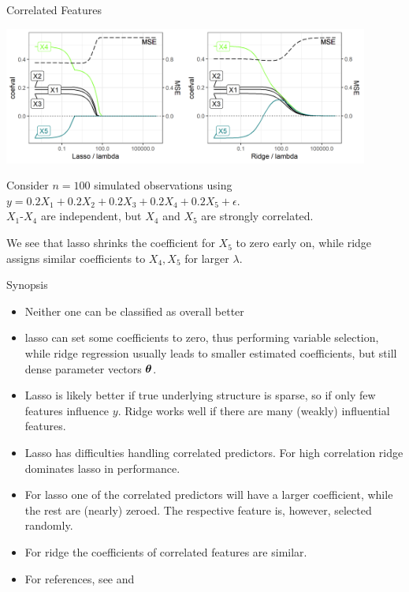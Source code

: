 \documentclass[11pt,compress,t,notes=noshow, xcolor=table]{beamer}
\begin{document}
\begin{vbframe}{Correlated Features}


\includegraphics[width=0.9\textwidth]{figure/regu_example_multicollinearity.png}

Consider $n=100$ simulated observations using $y = 0.2X_1 + 0.2X_2 + 0.2X_3 + 0.2X_4 + 0.2X_5 + \epsilon$.\\
$X_1$-$X_4$ are independent, but $X_4$ and $X_5$ are strongly correlated.

\vspace{0.1cm}

We see that lasso shrinks the coefficient for $X_5$ to zero early on, while ridge assigns similar coefficients to $X_4, X_5$ for larger $\lambda$.

\end{vbframe}


\begin{vbframe}{Synopsis}

\begin{itemize}
\item Neither one can be classified as overall better
\item lasso can set some coefficients to zero, thus performing variable selection, while ridge regression usually leads to smaller estimated coefficients, but still dense parameter vectors $\bm{\theta}$.
\item Lasso is likely better if true underlying structure is sparse, so if only few features influence $y$. Ridge works well if there are many (weakly) influential features.
\item Lasso has difficulties handling correlated predictors. For high correlation ridge dominates lasso in performance.
\item For lasso one of the correlated predictors will have a larger coefficient, while the rest are (nearly) zeroed. The respective feature is, however, selected randomly. 
\item For ridge the coefficients of correlated features are similar.
\item For references, see  and 
\end{itemize}

\end{vbframe}

\endlecture
\end{document}
